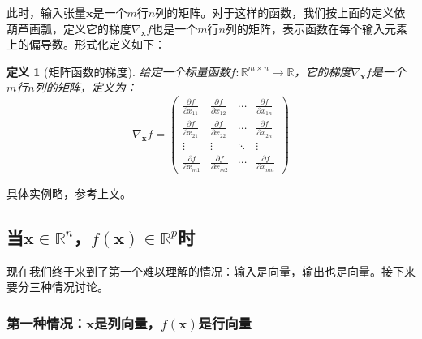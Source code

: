 \documentclass[
    UTF8,
    a4paper,
    12pt
]{ctexart}
\newtheorem{definition}{定义}
\begin{document}
此时，输入张量$\mathbf{x}$是一个$m$行$n$列的矩阵。对于这样的函数，我们按上面的定义依葫芦画瓢，定义它的梯度$\nabla_\mathbf{x} f$也是一个$m$行$n$列的矩阵，表示函数在每个输入元素上的偏导数。形式化定义如下：
\begin{definition}[矩阵函数的梯度]
    给定一个标量函数$f: \mathbb{R}^{m \times n} \to \mathbb{R}$，它的梯度$\nabla_\mathbf{x} f$是一个$m$行$n$列的矩阵，定义为：
    \begin{equation}
        \nabla_\mathbf{x} f = \begin{pmatrix}
            \frac{\partial f}{\partial x_{11}} & \frac{\partial f}{\partial x_{12}} & \cdots & \frac{\partial f}{\partial x_{1n}} \\
            \frac{\partial f}{\partial x_{21}} & \frac{\partial f}{\partial x_{22}} & \cdots & \frac{\partial f}{\partial x_{2n}} \\
            \vdots & \vdots & \ddots & \vdots \\
            \frac{\partial f}{\partial x_{m1}} & \frac{\partial f}{\partial x_{m2}} & \cdots & \frac{\partial f}{\partial x_{mn}}
        \end{pmatrix}
    \end{equation}
\end{definition}
具体实例略，参考上文。

\subsection{当$\mathbf{x}\in\mathbb{R}^{n}$，$f(\mathbf{x})\in \mathbb{R}^{p}$时}

现在我们终于来到了第一个难以理解的情况：输入是向量，输出也是向量。接下来要分三种情况讨论。

\subsubsection{第一种情况：$\mathbf{x}$是列向量，$f(\mathbf{x})$是行向量}
\end{document}
